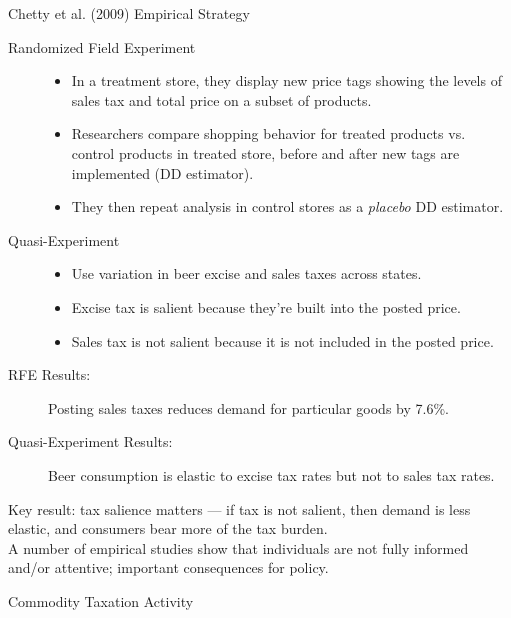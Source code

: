 \documentclass[10pt]{extarticle}
\begin{document}
  \begin{problem}{Chetty et al. (2009) Empirical Strategy}
    \begin{description}
      \item[Randomized Field Experiment]\hfill
        \begin{itemize}
          \item In a treatment store, they display new price tags showing the levels of sales tax and total price on a subset of products.
          \item Researchers compare shopping behavior for treated products vs. control products in treated store, before and after new tags are implemented (DD estimator).
          \item They then repeat analysis in control stores as a \textit{placebo} DD estimator.
        \end{itemize}
      \item[Quasi-Experiment]\hfill
        \begin{itemize}
          \item Use variation in beer excise and sales taxes across states.
          \item Excise tax is salient because they're built into the posted price.
          \item Sales tax is not salient because it is not included in the posted price.
        \end{itemize}
    \end{description}
    \begin{description}
      \item[RFE Results:] Posting sales taxes reduces demand for particular goods by 7.6\%.
      \item[Quasi-Experiment Results:] Beer consumption is elastic to excise tax rates but not to sales tax rates.
    \end{description}
    Key result: tax salience matters --- if tax is not salient, then demand is less elastic, and consumers bear more of the tax burden.\\

    A number of empirical studies show that individuals are not fully informed and/or attentive; important consequences for policy.
  \end{problem}
  \begin{problem}{Commodity Taxation Activity}
    \begin{tcbraster}[raster columns = 1, sharp corners, colframe = black!75!white,colback=white]
    \end{tcbraster}
  \end{problem}
\end{document}
